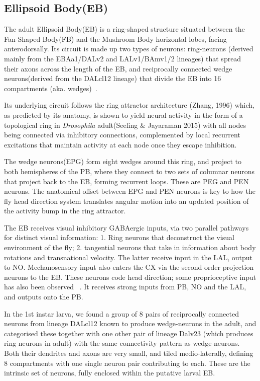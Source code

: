 \documentclass{article}
\begin{document}
\subsection{Ellipsoid Body(EB)}
The adult Ellipsoid Body(EB) is a ring-shaped structure situated between the Fan-Shaped Body(FB) and the Mushroom Body horizontal lobes, facing anterodorsally. Its circuit is made up two types of neurons: ring-neurons (derived mainly from the EBAa1/DALv2 and LALv1/BAmv1/2 lineages) that spread their axons across the length of the EB, and reciprocally connected wedge neurons(derived from the DALcl12 lineage) that divide the EB into 16 compartments (aka. wedges)~\citep{omoto2018neuronal}. 

Its underlying circuit follows the ring attractor architecture (Zhang, 1996) which, as predicted by its anatomy, is shown to yield neural activity in the form of a topological ring in \textit{Drosophila} adult(Seeling \& Jayaraman 2015) with all nodes being connected via inhibitory connections, complemented by local recurrent excitations that maintain activity at each node once they escape inhibition.%

The wedge neurons(EPG) form eight wedges around this ring, and project to both hemispheres of the PB, where they connect to two sets of columnar neurons that project back to the EB, forming recurrent loops. These are PEG and PEN neurons. The anatomical offset between EPG and PEN neurons is key to how the fly head direction system translates angular motion into an updated position of the activity bump in the ring attractor. 


The EB receives visual inhibitory GABAergic inputs, via two parallel pathways for distinct visual information:
1. Ring neurons that deconstruct the visual environment of the fly; 2. tangential neurons that take in information about body rotations and transnational velocity. The latter receive input in the LAL, output to NO.
Mechanosensory input also enters the CX via the second order projection neurons to the EB. These neurons code head direction; some proprioceptive input has also been observed 
~\citep{hulse2021connectome}. It receives strong inputs from PB, NO and the LAL, and outputs onto the PB.  


In the 1st instar larva, we found a group of 8 pairs of reciprocally connected neurons from lineage DALcl12 known to produce wedge-neurons in the adult, and categorised these together with one other pair of lineage Dalv23 (which produces ring neurons in adult) with the same connectivity pattern as wedge-neurons. Both their dendrites and axons are very small, and tiled medio-laterally, defining 8 compartments with one single neuron pair contributing to each. These are the intrinsic set of neurons, fully enclosed within the putative larval EB. 
\end{document}
